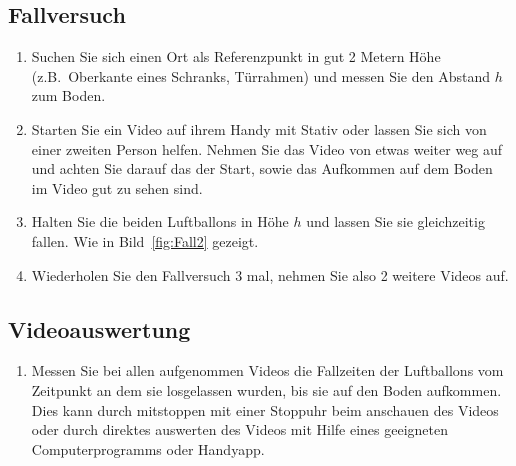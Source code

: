 \documentclass{article}
\begin{document}
      \subsection{Fallversuch}
          \begin{enumerate}[resume]
              \item Suchen Sie sich einen Ort als Referenzpunkt in gut 2 Metern Höhe (z.B.\ Oberkante eines Schranks, Türrahmen) und messen Sie
                    den Abstand \(h\) zum Boden.
              \item Starten Sie ein Video auf ihrem Handy mit Stativ oder lassen Sie sich von einer zweiten Person helfen.
                    Nehmen Sie das Video von etwas weiter weg auf und achten Sie darauf das der Start, sowie das Aufkommen auf dem Boden im Video gut zu sehen sind.
              \item Halten Sie die beiden Luftballons in Höhe \(h\) und lassen Sie sie gleichzeitig fallen. Wie in Bild~\ref{fig:Fall2} gezeigt.
              \item Wiederholen Sie den Fallversuch 3 mal, nehmen Sie also 2 weitere Videos auf.
          \end{enumerate}

      \subsection{Videoauswertung}
          \begin{enumerate}
              \item Messen Sie bei allen aufgenommen Videos die Fallzeiten der Luftballons vom Zeitpunkt an dem sie losgelassen wurden, bis sie auf den Boden aufkommen.
                    Dies kann durch mitstoppen mit einer Stoppuhr beim anschauen des Videos oder durch direktes auswerten des Videos mit Hilfe eines geeigneten Computerprogramms oder Handyapp.
          \end{enumerate}
\end{document}

